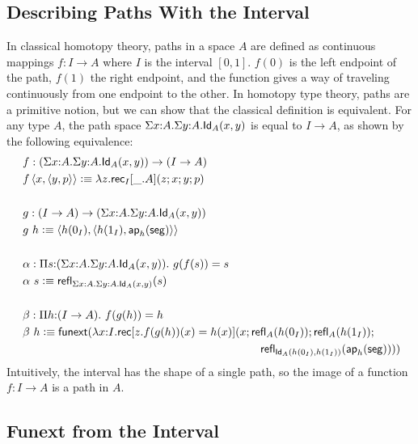 \documentclass[11pt]{article}
\newcommand*{\Interval}{I}
\newcommand*{\Izero}{0_I}
\newcommand*{\Ione}{1_I}
\newcommand*{\Iseg}{\mathsf{seg}}
\newcommand*{\ap}{\mathsf{ap}}
\newcommand*{\funext}{\mathsf{funext}}
\begin{document}
\subsection*{Describing Paths With the Interval}

In classical homotopy theory, paths in a space $A$ are defined as continuous mappings $f : I \to A$ where $I$ is the interval $[0,1]$. $f(0)$ is the left endpoint of the path, $f(1)$ the right endpoint, and the function gives a way of traveling continuously from one endpoint to the other. In homotopy type theory, paths are a primitive notion, but we can show that the classical definition is equivalent. For any type $A$, the path space $\Sigma x{:}A. \Sigma y{:}A. \mathsf{Id}_{A}(x,y)$ is equal to $I \to A$, as shown by the following equivalence:
\begin{align*}
  & f : (\Sigma x{:}A. \Sigma y{:}A. \Id{A}(x,y)) \to (I \to A) \\
  & f \left<x,\left<y,p\right>\right> \defeq \lambda z. \rec_\Interval[\_.A](z;x;y;p) \\
  ~ \\
  & g : (I \to A) \to (\Sigma x{:}A.\Sigma y{:}A. \Id{A}(x,y)) \\
  & g~h \defeq \left< h(\Izero), \left<h(\Ione), \ap_h(\Iseg)\right> \right> \\
  ~ \\
  & \alpha : \Pi s{:} (\Sigma x{:}A.\Sigma y{:}A. \Id{A}(x,y)).~g(f(s)) = s \\
  & \alpha~s \defeq \refl{\Sigma x{:}A. \Sigma y{:}A. \Id{A}(x,y)}(s) \\ 
  ~ \\
  & \beta : \Pi h{:}(I \to A).~f(g(h)) = h \\
  & \beta~h \defeq \funext(\lambda x{:}I. \rec[z. f(g(h))(x) = h(x)](x; \refl{A}(h(\Izero)); \refl{A}(h(\Ione)); \\
  & \hspace{210pt} \refl{\Id{A}(h(\Izero),h(\Ione))}(\ap_h(\Iseg))))
\end{align*}
Intuitively, the interval has the shape of a single path, so the image of a function $f : I \to A$ is a path in $A$.

\subsection*{{\sc Funext} from the Interval}
\end{document}

